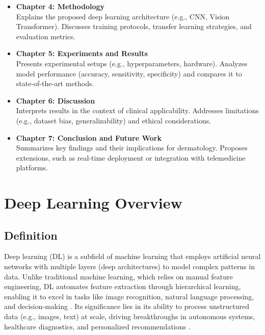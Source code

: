 \documentclass[a4paper,12pt]{report}
\begin{document}
\begin{spacing}{1.5}
\begin{itemize}
        \item \textbf{Chapter 4: Methodology} \\
        Explains the proposed deep learning architecture (e.g., CNN, Vision Transformer). Discusses training protocols, transfer learning strategies, and evaluation metrics.

        \item \textbf{Chapter 5: Experiments and Results} \\
        Presents experimental setups (e.g., hyperparameters, hardware). Analyzes model performance (accuracy, sensitivity, specificity) and compares it to state-of-the-art methods.

        \item \textbf{Chapter 6: Discussion} \\
        Interprets results in the context of clinical applicability. Addresses limitations (e.g., dataset bias, generalizability) and ethical considerations.

        \item \textbf{Chapter 7: Conclusion and Future Work} \\
        Summarizes key findings and their implications for dermatology. Proposes extensions, such as real-time deployment or integration with telemedicine platforms.
    \end{itemize}



\chapter{Deep Learning Overview}
    \section{Definition}
    Deep learning (DL) is a subfield of machine learning that employs artificial neural networks with multiple layers (deep architectures) to model complex patterns in data. Unlike traditional machine learning, which relies on manual feature engineering, DL automates feature extraction through hierarchical learning, enabling it to excel in tasks like image recognition, natural language processing, and decision-making \cite{dl}. Its significance lies in its ability to process unstructured data (e.g., images, text) at scale, driving breakthroughs in autonomous systems, healthcare diagnostics, and personalized recommendations \cite{dl2}.


\end{spacing}
\end{document}
